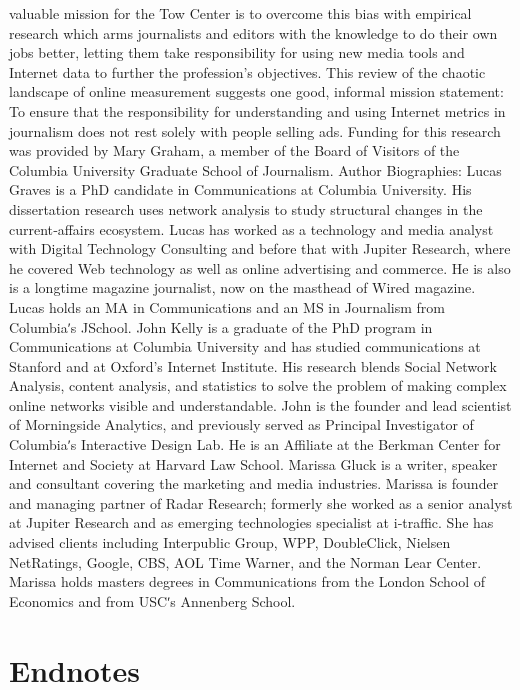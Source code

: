 valuable mission for the Tow Center is to overcome this bias with
empirical research which arms journalists and editors with the knowledge
to do their own jobs better, letting them take responsibility for using new
media tools and Internet data to further the profession’s objectives. This
review of the chaotic landscape of online measurement suggests one good,
informal mission statement: To ensure that the responsibility for
understanding and using Internet metrics in journalism does not rest
solely with people selling ads.
Funding for this research was provided by Mary Graham, a member of
the Board of Visitors of the Columbia University Graduate School of
Journalism.
Author Biographies:
Lucas Graves is a PhD candidate in Communications at Columbia
University. His dissertation research uses network analysis to study
structural changes in the current‐affairs ecosystem. Lucas has worked as a
technology and media analyst with Digital Technology Consulting and
before that with Jupiter Research, where he covered Web technology as
well as online advertising and commerce. He is also is a longtime
magazine journalist, now on the masthead of Wired magazine. Lucas holds
an MA in Communications and an MS in Journalism from Columbiaʹs JSchool.
John Kelly is a graduate of the PhD program in Communications at
Columbia University and has studied communications at Stanford and at
Oxford’s Internet Institute. His research blends Social Network Analysis,
content analysis, and statistics to solve the problem of making complex
online networks visible and understandable. John is the founder and lead
scientist of Morningside Analytics, and previously served as Principal
Investigator of Columbiaʹs Interactive Design Lab. He is an Affiliate at the
Berkman Center for Internet and Society at Harvard Law School.
Marissa Gluck is a writer, speaker and consultant covering the marketing
and media industries. Marissa is founder and managing partner of Radar
Research; formerly she worked as a senior analyst at Jupiter Research and
as emerging technologies specialist at i‐traffic. She has advised clients
including Interpublic Group, WPP, DoubleClick, Nielsen NetRatings,
Google, CBS, AOL Time Warner, and the Norman Lear Center. Marissa
holds masters degrees in Communications from the London School of
Economics and from USCʹs Annenberg School.

\chapter{Endnotes}

